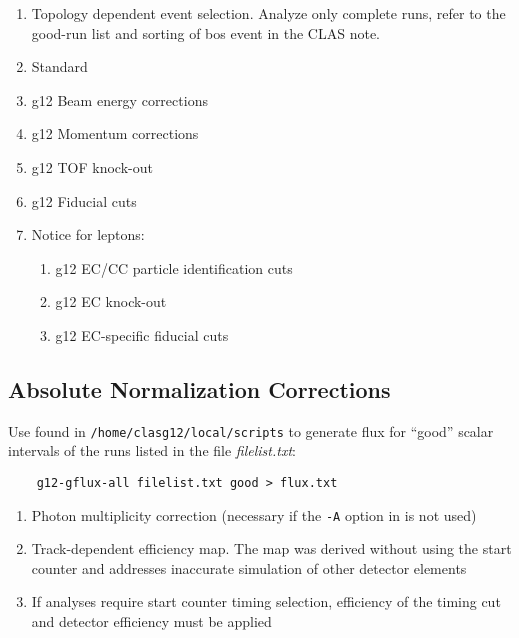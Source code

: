 \documentclass[10pt,twocolumn,oneside,letterpaper]{article}
\begin{document}
\begin{enumerate}
    \item Topology dependent event selection. Analyze only complete runs, refer to the good-run list and sorting of bos event in the CLAS note.
    \item Standard 
    \item g12 Beam energy corrections
    \item g12 Momentum corrections
    \item g12 TOF knock-out
    \item g12 Fiducial cuts
    \item Notice for leptons:
    \begin{enumerate}
        \item g12 EC/CC particle identification cuts
        \item g12 EC knock-out
        \item g12 EC-specific fiducial cuts
    \end{enumerate}
\end{enumerate}

\subsection{Absolute Normalization Corrections}

Use  found in \verb+/home/clasg12/local/scripts+ to generate flux for ``good'' scalar intervals of the runs listed in the file \textit{filelist.txt}:
\begin{verbatim}
    g12-gflux-all filelist.txt good > flux.txt
\end{verbatim}

\begin{enumerate}
    \item Photon multiplicity correction (necessary if the \verb|-A| option in  is not used)
    \item Track-dependent efficiency map. The map was derived without using the start counter and addresses inaccurate simulation of other detector elements
    \item If analyses require start counter timing selection, efficiency of the timing cut and detector efficiency must be applied
\end{enumerate}


\end{document}
